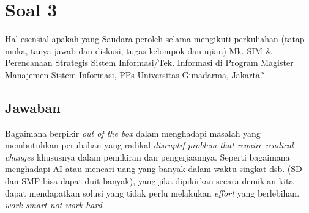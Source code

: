 \documentclass{article}
\begin{document}
\section*{Soal 3}
Hal esensial apakah yang Saudara peroleh selama mengikuti perkuliahan (tatap muka,
tanya jawab dan diskusi, tugas kelompok dan ujian) Mk. SIM \& Perencanaan Strategis
Sistem Informasi/Tek. Informasi di Program Magister Manajemen Sistem Informasi, PPs
Universitas Gunadarma, Jakarta?
\subsection*{Jawaban}
Bagaimana berpikir \emph{out of the box} dalam menghadapi masalah yang membutuhkan  perubahan yang radikal \emph{disruptif problem that require readical changes} khususnya dalam pemikiran dan pengerjaannya. Seperti bagaimana menghadapi AI atau mencari uang yang banyak dalam waktu singkat dsb. (SD dan SMP bisa dapat duit banyak), yang jika dipikirkan secara demikian kita dapat mendapatkan solusi yang tidak perlu melakukan \emph{effort} yang berlebihan. \emph{work smart not work hard}
% 
% 
\end{document}
